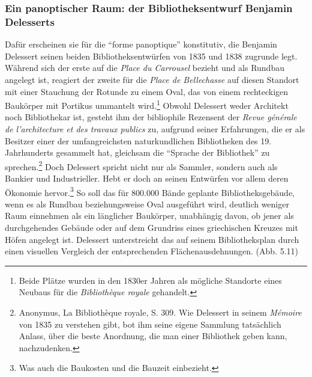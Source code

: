 \subsubsection{Ein panoptischer Raum: der Bibliotheksentwurf Benjamin
Delesserts}\label{ein-panoptischer-raum-der-bibliotheksentwurf-benjamin-delesserts}

Dafür erscheinen sie für die \enquote{forme panoptique} konstitutiv, die
Benjamin Delessert seinen beiden Bibliotheksentwürfen von 1835 und 1838
zugrunde legt. Während sich der erste auf die \emph{Place du Carrousel}
bezieht und als Rundbau angelegt ist, reagiert der zweite für die
\emph{Place de Bellechasse} auf diesen Standort mit einer Stauchung der
Rotunde zu einem Oval, das von einem rechteckigen Baukörper mit Portikus
ummantelt wird.\footnote{Beide Plätze wurden in den 1830er Jahren als
  mögliche Standorte eines Neubaus für die \emph{Bibliothèque royale}
  gehandelt.} Obwohl Delessert weder Architekt noch Bibliothekar ist,
gesteht ihm der bibliophile Rezensent der \emph{Revue générale de
l'architecture et des travaux publics} zu, aufgrund seiner Erfahrungen,
die er als Besitzer einer der umfangreichsten naturkundlichen
Bibliotheken des 19. Jahrhunderts gesammelt hat, gleichsam die
\enquote{Sprache der Bibliothek} zu sprechen.\footnote{Anonymus, La
  Bibliothèque royale, S. 309. Wie Delessert in seinem \emph{Mémoire}
  von 1835 zu verstehen gibt, bot ihm seine eigene Sammlung tatsächlich
  Anlass, über die beste Anordnung, die man einer Bibliothek geben kann,
  nachzudenken.} Doch Delessert spricht nicht nur als Sammler, sondern
auch als Bankier und Industrieller. Hebt er doch an seinen Entwürfen vor
allem deren Ökonomie hervor.\footnote{Was auch die Baukosten und die
  Bauzeit einbezieht.} So soll das für 800.000 Bände geplante
Bibliotheksgebäude, wenn es als Rundbau beziehungsweise Oval ausgeführt
wird, deutlich weniger Raum einnehmen als ein länglicher Baukörper,
unabhängig davon, ob jener als durchgehendes Gebäude oder auf dem
Grundriss eines griechischen Kreuzes mit Höfen angelegt ist. Delessert
unterstreicht das auf seinem Bibliotheksplan durch einen visuellen
Vergleich der entsprechenden Flächenausdehnungen. (Abb. 5.11)

